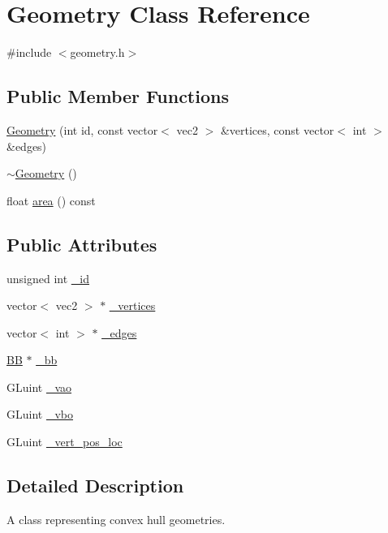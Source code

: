 \hypertarget{class_geometry}{\section{Geometry Class Reference}
\label{class_geometry}
}


{\ttfamily \#include $<$geometry.\+h$>$}

\subsection*{Public Member Functions}
\begin{DoxyCompactItemize}
\item 
\hyperlink{class_geometry_a75dcc4432a7296189d625717b808c451}{Geometry} (int id, const vector$<$ vec2 $>$ \&vertices, const vector$<$ int $>$ \&edges)
\item 
\hyperlink{class_geometry_ad55e832122ab3a2833dcaa6507867678}{$\sim$\+Geometry} ()
\item 
float \hyperlink{class_geometry_a41f3f2954a86d1f2e09bdd59b4c6d62e}{area} () const 
\end{DoxyCompactItemize}
\subsection*{Public Attributes}
\begin{DoxyCompactItemize}
\item 
unsigned int \hyperlink{class_geometry_afdd3cb26908cc8cd257caeb1af9376ef}{\+\_\+id}
\item 
vector$<$ vec2 $>$ $\ast$ \hyperlink{class_geometry_a6bba14459d18ceb7000fe8e36c96b509}{\+\_\+vertices}
\item 
vector$<$ int $>$ $\ast$ \hyperlink{class_geometry_af7d427b2dd365204c7d8cd8d94b20a80}{\+\_\+edges}
\item 
\hyperlink{class_b_b}{B\+B} $\ast$ \hyperlink{class_geometry_a6b3ca6d44997ee99d548a19bc39e0c72}{\+\_\+bb}
\item 
G\+Luint \hyperlink{class_geometry_ae8c3a8b756c681aa95bf7e0998f0a37d}{\+\_\+vao}
\item 
G\+Luint \hyperlink{class_geometry_a66c15fff8a8a614e5f9734974354fd2e}{\+\_\+vbo}
\item 
G\+Luint \hyperlink{class_geometry_a547d84fcd9258557891da46d19985544}{\+\_\+vert\+\_\+pos\+\_\+loc}
\end{DoxyCompactItemize}


\subsection{Detailed Description}
A class representing convex hull geometries. 

